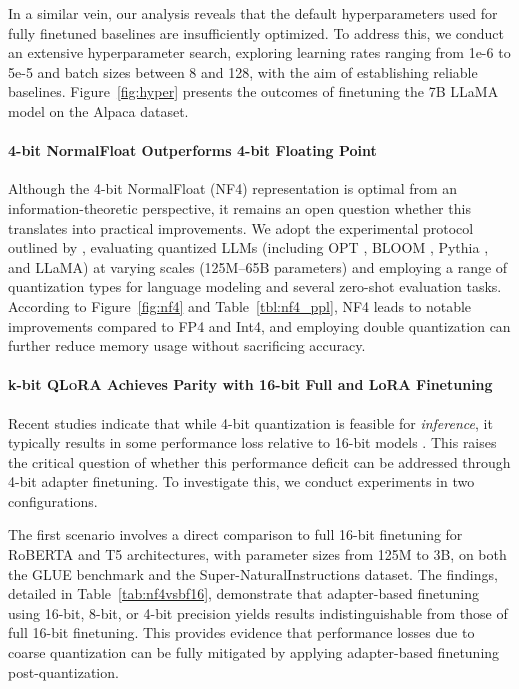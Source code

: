 In a similar vein, our analysis reveals that the default hyperparameters used for fully finetuned baselines are insufficiently optimized. To address this, we conduct an extensive hyperparameter search, exploring learning rates ranging from 1e-6 to 5e-5 and batch sizes between 8 and 128, with the aim of establishing reliable baselines. Figure~\ref{fig:hyper} presents the outcomes of finetuning the 7B LLaMA model on the Alpaca dataset.

\paragraph{4-bit NormalFloat Outperforms 4-bit Floating Point}

Although the 4-bit NormalFloat (NF4) representation is optimal from an information-theoretic perspective, it remains an open question whether this translates into practical improvements. We adopt the experimental protocol outlined by \citet{dettmers2022case}, evaluating quantized LLMs (including OPT \citep{zhang2022opt}, BLOOM \cite{scao2022bloom}, Pythia \cite{biderman2023pythia}, and LLaMA) at varying scales (125M–65B parameters) and employing a range of quantization types for language modeling and several zero-shot evaluation tasks. According to Figure~\ref{fig:nf4} and Table~\ref{tbl:nf4_ppl}, NF4 leads to notable improvements compared to FP4 and Int4, and employing double quantization can further reduce memory usage without sacrificing accuracy.

\paragraph{k-bit \textsc{QLoRA} Achieves Parity with 16-bit Full and LoRA Finetuning} 

Recent studies indicate that while 4-bit quantization is feasible for \emph{inference}, it typically results in some performance loss relative to 16-bit models \citep{dettmers2022case,frantar2022gptq}. This raises the critical question of whether this performance deficit can be addressed through 4-bit adapter finetuning. To investigate this, we conduct experiments in two configurations.

The first scenario involves a direct comparison to full 16-bit finetuning for RoBERTA and T5 architectures, with parameter sizes from 125M to 3B, on both the GLUE benchmark and the Super-NaturalInstructions dataset. The findings, detailed in Table~\ref{tab:nf4vsbf16}, demonstrate that adapter-based finetuning using 16-bit, 8-bit, or 4-bit precision yields results indistinguishable from those of full 16-bit finetuning. This provides evidence that performance losses due to coarse quantization can be fully mitigated by applying adapter-based finetuning post-quantization.


